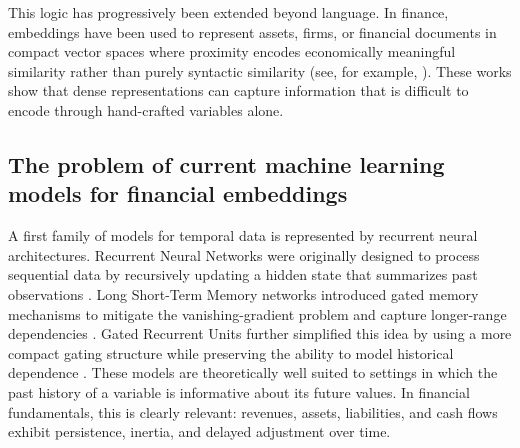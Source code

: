 \documentclass[a4paper,fleqn]{cas-dc}
\begin{document}
This logic has progressively been extended beyond language. In finance, embeddings have been used to represent assets, firms, or financial documents in compact vector spaces where proximity encodes economically meaningful similarity rather than purely syntactic similarity (see, for example, \citealt{adosoglou_neural_2021,stock_embedding_2022,gabaix_asset_2025}). These works show that dense representations can capture information that is difficult to encode through hand-crafted variables alone.


\subsection{The problem of  current machine learning models for financial embeddings}

A first family of models for temporal data is represented by recurrent neural architectures. Recurrent Neural Networks were originally designed to process sequential data by recursively updating a hidden state that summarizes past observations \citep{elman1990finding}. Long Short-Term Memory networks introduced gated memory mechanisms to mitigate the vanishing-gradient problem and capture longer-range dependencies \citep{hochreiter1997long}. Gated Recurrent Units further simplified this idea by using a more compact gating structure while preserving the ability to model historical dependence \citep{cho2014learning}. These models are theoretically well suited to settings in which the past history of a variable is informative about its future values. In financial fundamentals, this is clearly relevant: revenues, assets, liabilities, and cash flows exhibit persistence, inertia, and delayed adjustment over time.
\end{document}
